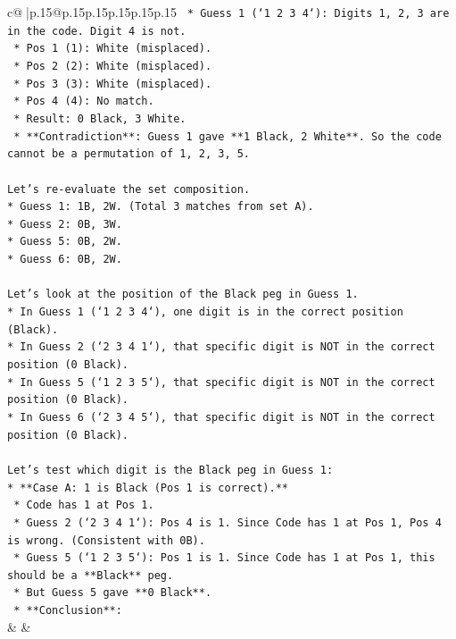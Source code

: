\documentclass{article}
\begin{document}
{\begin{supertabular}{c@{$\;$}|p{.15\linewidth}@{}p{.15\linewidth}p{.15\linewidth}p{.15\linewidth}p{.15\linewidth}p{.15\linewidth}}
{{{\texttt{        *   Guess 1 (`1 2 3 4`): Digits 1, 2, 3 are in the code. Digit 4 is not.} \\
\texttt{            *   Pos 1 (1): White (misplaced).} \\
\texttt{            *   Pos 2 (2): White (misplaced).} \\
\texttt{            *   Pos 3 (3): White (misplaced).} \\
\texttt{            *   Pos 4 (4): No match.} \\
\texttt{            *   Result: 0 Black, 3 White.} \\
\texttt{            *   **Contradiction**: Guess 1 gave **1 Black, 2 White**. So the code cannot be a permutation of 1, 2, 3, 5.} \\
\\ 
\texttt{Let's re{-}evaluate the set composition.} \\
\texttt{*   Guess 1: 1B, 2W. (Total 3 matches from set A).} \\
\texttt{*   Guess 2: 0B, 3W.} \\
\texttt{*   Guess 5: 0B, 2W.} \\
\texttt{*   Guess 6: 0B, 2W.} \\
\\ 
\texttt{Let's look at the position of the Black peg in Guess 1.} \\
\texttt{*   In Guess 1 (`1 2 3 4`), one digit is in the correct position (Black).} \\
\texttt{*   In Guess 2 (`2 3 4 1`), that specific digit is NOT in the correct position (0 Black).} \\
\texttt{*   In Guess 5 (`1 2 3 5`), that specific digit is NOT in the correct position (0 Black).} \\
\texttt{*   In Guess 6 (`2 3 4 5`), that specific digit is NOT in the correct position (0 Black).} \\
\\ 
\texttt{Let's test which digit is the Black peg in Guess 1:} \\
\texttt{*   **Case A: 1 is Black (Pos 1 is correct).**} \\
\texttt{    *   Code has 1 at Pos 1.} \\
\texttt{    *   Guess 2 (`2 3 4 1`): Pos 4 is 1. Since Code has 1 at Pos 1, Pos 4 is wrong. (Consistent with 0B).} \\
\texttt{    *   Guess 5 (`1 2 3 5`): Pos 1 is 1. Since Code has 1 at Pos 1, this should be a **Black** peg.} \\
\texttt{    *   But Guess 5 gave **0 Black**.} \\
\texttt{    *   **Conclusion**:} \\
            }
        }
    }
    & & \\ \\


\end{supertabular}}
\end{document}
